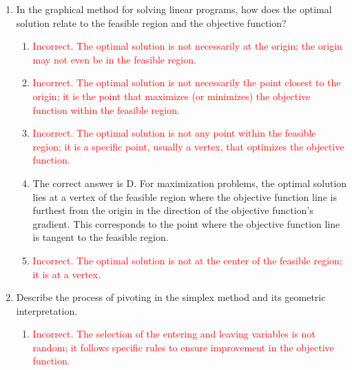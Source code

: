 \documentclass{article}%
\newcommand{\incorrect}[1]{\textcolor{red}{#1}}
\begin{document}
\begin{enumerate}
\begin{enumerate}
\item \incorrect{Incorrect. The classification of basic and non-basic variables is not solely based on whether they are slack or decision variables.  The simplex method iteratively changes both basic and non-basic variables (by changing the basis).}%
\item \incorrect{Incorrect. The assignment of basic and non-basic variables is not random; it is determined by the current basis and the pivot operation at each iteration.}%
\item \incorrect{Incorrect. The classification of basic and non-basic variables is not based on the coefficients in the objective function. It is determined by the current basis in the simplex tableau.}%
\end{enumerate}%
\vspace{1em}%
\item In the graphical method for solving linear programs, how does the optimal solution relate to the feasible region and the objective function?%
\begin{enumerate}%
\item \incorrect{Incorrect. The optimal solution is not necessarily at the origin; the origin may not even be in the feasible region.}%
\item \incorrect{Incorrect. The optimal solution is not necessarily the point closest to the origin; it is the point that maximizes (or minimizes) the objective function within the feasible region.}%
\item \incorrect{Incorrect. The optimal solution is not any point within the feasible region; it is a specific point, usually a vertex, that optimizes the objective function.}%
\item The correct answer is D. For maximization problems, the optimal solution lies at a vertex of the feasible region where the objective function line is furthest from the origin in the direction of the objective function's gradient.  This corresponds to the point where the objective function line is tangent to the feasible region.%
\item \incorrect{Incorrect. The optimal solution is not at the center of the feasible region; it is at a vertex.}%
\end{enumerate}%
\vspace{1em}%
\item Describe the process of pivoting in the simplex method and its geometric interpretation.%
\begin{enumerate}%
\item \incorrect{Incorrect. The selection of the entering and leaving variables is not random; it follows specific rules to ensure improvement in the objective function.}%

\end{enumerate}
\end{enumerate}
\end{document}
